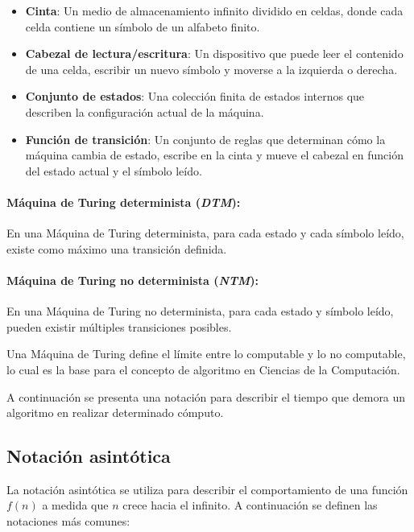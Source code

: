 \documentclass[12pt]{article}
\begin{document}
\begin{itemize}
      \item \textbf{Cinta}: Un medio de almacenamiento infinito dividido en celdas, donde cada celda contiene un símbolo de un alfabeto finito.
      \item \textbf{Cabezal de lectura/escritura}: Un dispositivo que puede leer el contenido de una celda, escribir un nuevo símbolo y moverse a la izquierda o derecha.
      \item \textbf{Conjunto de estados}: Una colección finita de estados internos que describen la configuración actual de la máquina.
      \item \textbf{Función de transición}: Un conjunto de reglas que determinan cómo la máquina cambia de estado, escribe en la cinta y mueve el cabezal en función del estado actual y el símbolo leído.
\end{itemize}

\paragraph{Máquina de Turing determinista (\textit{DTM}):}
En una Máquina de Turing determinista, para cada estado y cada símbolo leído, existe como máximo una transición
definida.
\paragraph{Máquina de Turing no determinista (\textit{NTM}):}
En una Máquina de Turing no determinista, para cada estado y símbolo leído, pueden existir múltiples
transiciones posibles.

Una Máquina de Turing define el límite entre lo computable y lo no computable, lo cual es la base para el concepto de 
algoritmo en Ciencias de la Computación.

A continuación se presenta una notación para describir el tiempo que demora un algoritmo en realizar determinado cómputo.

\subsection{Notación asintótica}

La notación asintótica se utiliza para describir el comportamiento de una función $f(n)$ a medida que $n$ crece hacia el infinito. A continuación se definen las notaciones más comunes:
\end{document}
